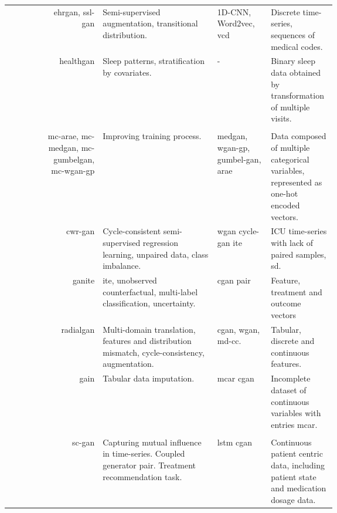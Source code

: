 \begin{landscape}
\begin{longtable}[l]{@{}p{0.10\linewidth}Rp{0.35\linewidth}Mp{0.20\linewidth}@{}}
        \citeauthor{Che_2017} & \gls{ehrgan}, \gls{ssl-gan} 
        & Semi-supervised augmentation, transitional distribution. & 1D-CNN, Word2vec, \gls{vcd}
        & Discrete time-series, sequences of medical codes. \\
        
        \citeauthor{Dash} & \gls{healthgan} & Sleep patterns, stratification by covariates. & - & Binary sleep data obtained by transformation of multiple visits.\\
        
        \hline
         & & & \\
        \hline
        
        \citeauthor{Camino2018-re} & \raggedright \gls{mc-arae}, \gls{mc-medgan}, \gls{mc-gumbelgan}, \gls{mc-wgan-gp}
        & Improving training process.  & \gls{medgan}, \gls{wgan-gp}, \gls{gumbel-gan}, \gls{arae}
        & Data composed of multiple categorical variables, represented as one-hot encoded vectors. \\
        
        \citeauthor{mcdermott2018semi} & \gls{cwr-gan}
        & Cycle-consistent semi-supervised regression learning, unpaired data, class imbalance. & \gls{wgan} \gls{cycle-gan} \gls{ite}
        & ICU time-series with lack of paired samples, \gls{sd}. \\
        
        \citeauthor{Yoon2018-ite} & \gls{ganite} 
        & \gls{ite}, unobserved counterfactual, multi-label classification, uncertainty. & \gls{cgan} pair
        & Feature, treatment and outcome vectors\\
        
        \citeauthor{Yoon2018-radial} & \gls{radialgan} 
        & Multi-domain translation, features and distribution mismatch, cycle-consistency, augmentation. & \gls{cgan}, \gls{wgan}, \gls{md-cc}.
        & Tabular, discrete and continuous features.\\
        
        \citeauthor{yoon2018imputation} & \gls{gain}
        & Tabular data imputation. & \gls{mcar} \gls{cgan}
        & Incomplete dataset of continuous variables with entries \gls{mcar}.\\
        
        \hline
         & & & \\
        \hline
        
        \citeauthor{Wang_2019} & \gls{sc-gan}
        & Capturing mutual influence in time-series. Coupled generator pair. Treatment recommendation task. & \gls{lstm} \gls{cgan}
        & Continuous patient centric data, including patient state and medication dosage data.\\
        

\end{longtable}
\end{landscape}
